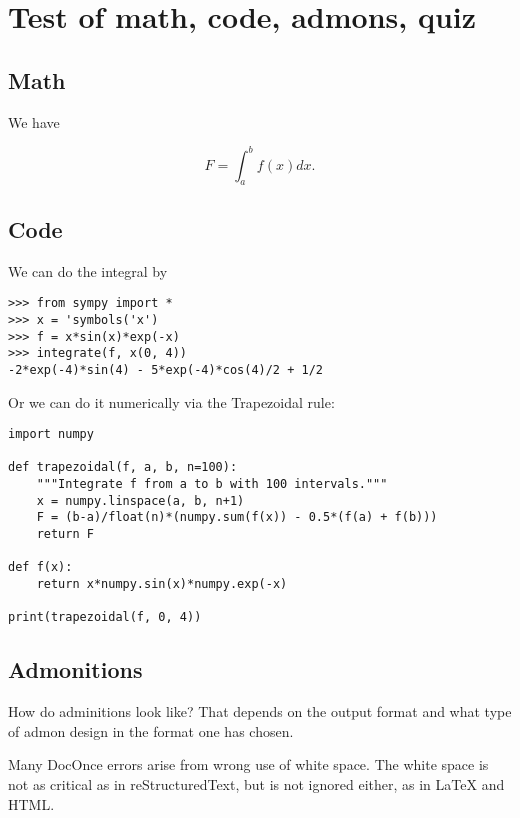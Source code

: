 \documentclass[%
oneside,                 %
final,                   %
10pt]{article}
\newenvironment{warning_mdfboxadmon}[1][]{
\begin{warning_mdfboxmdframed}[frametitle=#1]
}
{
\end{warning_mdfboxmdframed}
}
\newenvironment{question_mdfboxadmon}[1][]{
\begin{question_mdfboxmdframed}[frametitle=#1]
}
{
\end{question_mdfboxmdframed}
}
\begin{document}
\section{Test of math, code, admons, quiz}

\subsection{Math}

We have

\begin{equation}
F = \int_a^b f(x)dx.
\end{equation}

\subsection{Code}

We can do the integral by

\begin{Verbatim}[numbers=none,fontsize=\fontsize{9pt}{9pt},baselinestretch=0.95,xleftmargin=2mm]
>>> from sympy import *
>>> x = 'symbols('x')
>>> f = x*sin(x)*exp(-x)
>>> integrate(f, x(0, 4))
-2*exp(-4)*sin(4) - 5*exp(-4)*cos(4)/2 + 1/2
\end{Verbatim}

Or we can do it numerically via the Trapezoidal rule:

\begin{Verbatim}[numbers=none,fontsize=\fontsize{9pt}{9pt},baselinestretch=0.95,xleftmargin=2mm]
import numpy

def trapezoidal(f, a, b, n=100):
    """Integrate f from a to b with 100 intervals."""
    x = numpy.linspace(a, b, n+1)
    F = (b-a)/float(n)*(numpy.sum(f(x)) - 0.5*(f(a) + f(b)))
    return F

def f(x):
    return x*numpy.sin(x)*numpy.exp(-x)

print(trapezoidal(f, 0, 4))
\end{Verbatim}

\subsection{Admonitions}


\begin{question_mdfboxadmon}[Question.]
How do adminitions look like? That depends on the output format and
what type of admon design in the format one has chosen.
\end{question_mdfboxadmon} %




\begin{warning_mdfboxadmon}
Many DocOnce errors arise from wrong use of white space. The white space
is not as critical as in reStructuredText, but is not ignored either,
as in {\LaTeX} and HTML.
\end{warning_mdfboxadmon} %




\end{document}
